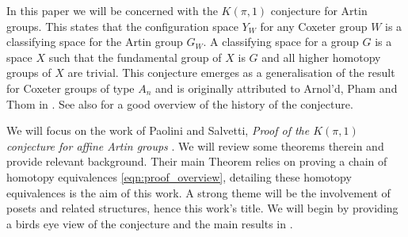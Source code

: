 \documentclass[class=guthesis, crop=false]{standalone}
\begin{document}
In this paper we will be concerned with the $K(\pi,1)$ conjecture for Artin groups. This states that the configuration space $Y_W$ for any Coxeter group $W$ is a classifying space for the Artin group $G_W$. A classifying space for a group $G$ is a space $X$ such that the fundamental group of $X$ is $G$ and all higher homotopy groups of $X$ are trivial. This conjecture emerges as a generalisation of the result for Coxeter groups of type $A_n$ and is originally attributed to Arnol'd, Pham and Thom in \cite{lek_homotopy_1983}. See also \cite{charney_davis_pi_1995} for a good overview of the history of the conjecture.

We will focus on the work of Paolini and Salvetti, \emph{Proof of the $K(\pi, 1)$ conjecture for affine Artin groups} \cite{paolini_salvetti_kpi1_2021}. We will review some theorems therein and provide relevant background. Their main Theorem relies on proving a chain of homotopy equivalences \eqref{eqn:proof_overview}, detailing these homotopy equivalences is the aim of this work. A strong theme will be the involvement of posets and related structures, hence this work's title. We will begin by providing a birds eye view of the conjecture and the  main results in \cite{paolini_salvetti_kpi1_2021}.
\end{document}
